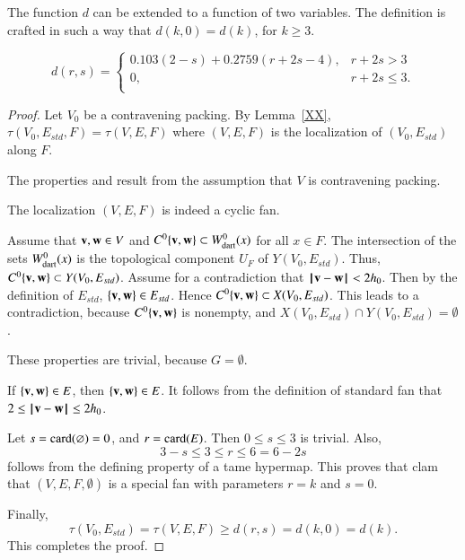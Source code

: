 The function $d$ can be extended to a function of two variables.  The definition is crafted in such a way that $d(k,0) = d(k)$, for $k\ge 3$.

\begin{definition}[d]
$$d(r,s) = \begin{cases}
    0.103 (2-s) + 0.2759 (r+2s-4), & r + 2s > 3\\
    0, & r + 2s \le 3.\\
    \end{cases}$$
\end{definition}



\begin{proof}
Let $V_0$ be a contravening packing.
By Lemma~\ref{XX}, $\tau(V_0,E_{std},F)=\tau(V,E,F)$  where $(V,E,F)$ is the
localization of
$(V_0,E_{std})$ along $F$. 

  The properties  and
 result from the assumption that $V$ is contravening
packing.  

  The localization $(V,E,F)$ is indeed a cyclic fan.

  Assume that ${\mathbf v},{\mathbf w}\in V$ and 
$C^0\{{\mathbf v},{\mathbf w}\}\subset W^0_{\text{dart}}(x)$ for all $x\in F$.
The intersection of the sets $W^0_{\text{dart}}(x)$ is the topological component
$U_F$ of $Y(V_0,E_{std})$.  Thus, $C^0\{{\mathbf v},{\mathbf w}\}\subset Y(V_0,E_{std})$.
Assume for a contradiction that ${\hskip0.1em|\hskip-0.15em|\hskip0.1em}{\mathbf v} - {\mathbf w}{\hskip0.1em|\hskip-0.15em|\hskip0.1em}< 2{h_0}$. Then by the definition of $E_{std}$, $\{{\mathbf v},{\mathbf w}\}\in E_{std}$.
Hence $C^0\{{\mathbf v},{\mathbf w}\}\subset X(V_0,E_{std})$. This leads to a contradiction, because
$C^0\{{\mathbf v},{\mathbf w}\}$ is nonempty, and $X(V_0,E_{std})\cap Y(V_0,E_{std})=\emptyset$.

   These properties are trivial, because $G=\emptyset$.

 If $\{{\mathbf v},{\mathbf w}\}\in E$, then $\{{\mathbf v},{\mathbf w}\}\in E$.  It follows from the definition of
standard fan that $2\le {\hskip0.1em|\hskip-0.15em|\hskip0.1em}{\mathbf v} - {\mathbf w}{\hskip0.1em|\hskip-0.15em|\hskip0.1em}\le 2{h_0}$.

 Let $s={\operatorname{card}}(\varnothing) = 0$, and $r={\operatorname{card}}(E)$.  Then $0\le s\le 3$ is trivial. Also, 
$$3-s \le 3\le r \le 6=6 - 2s$$
follows from the defining property  of a tame hypermap.  This proves that clam that
$(V,E,F,\emptyset)$ is a special fan with parameters $r=k$ and $s=0$.

Finally, 
$$\tau(V_0,E_{std})=\tau(V,E,F) \ge d(r,s) = d(k,0) = d(k).$$  
This completes the proof.
\end{proof}



